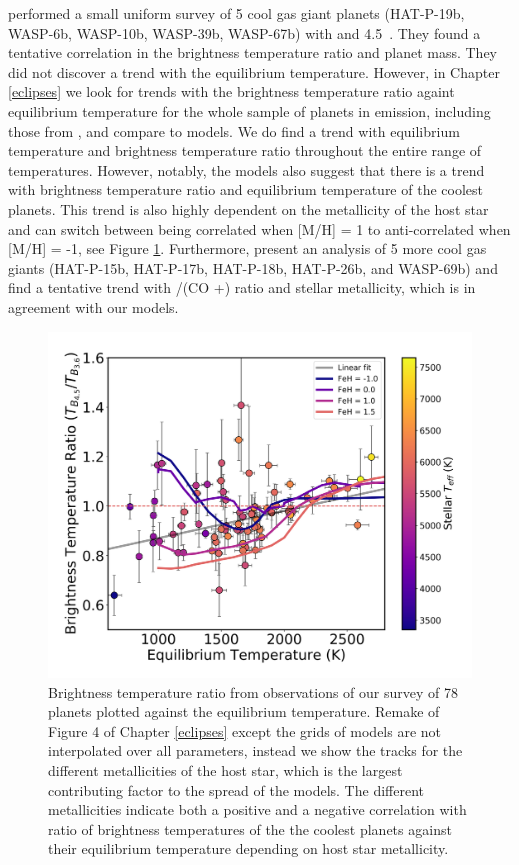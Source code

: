 \citet{Kammer2015} performed a small uniform survey of 5 cool gas giant planets (HAT-P-19b, WASP-6b, WASP-10b, WASP-39b, WASP-67b) with  and 4.5~\um. They found a tentative correlation in the brightness temperature ratio and planet mass. They did not discover a trend with the equilibrium temperature. However, in Chapter \ref{eclipses} we look for trends with the brightness temperature ratio againt equilibrium temperature for the whole sample of planets in emission, including those from \citet{Kammer2015}, and compare to models.
We do find a trend with equilibrium temperature and brightness temperature ratio throughout the entire range of temperatures. However, notably, the models also suggest that there is a trend with brightness temperature ratio and equilibrium temperature of the coolest planets. This trend is also highly dependent on the metallicity of the host star and can switch between being correlated when [M/H] = 1 to anti-correlated when [M/H] = -1, see Figure \ref{int:fig:Tbratio}. Furthermore, \citet{Wallack2019} present an analysis of 5 more cool gas giants (HAT-P-15b, HAT-P-17b, HAT-P-18b, HAT-P-26b, and WASP-69b) and find a tentative trend with /(CO +) ratio and stellar metallicity, which is in agreement with our models.

\begin{figure}
    \centering
    \includegraphics[width = \linewidth]{TbratiovsTeq_PHOENIX_intpl_wlabels.pdf}
    \caption{Brightness temperature ratio from \spitzerIRAC observations of our survey of 78 planets plotted against the equilibrium temperature. Remake of Figure 4 of Chapter \ref{eclipses} except the grids of models are not interpolated over all parameters, instead we show the tracks for the different metallicities of the host star, which is the largest contributing factor to the spread of the models. The different metallicities indicate both a positive and a negative correlation with ratio of brightness temperatures of the the coolest planets against their equilibrium temperature depending on host star metallicity. }
    \label{int:fig:Tbratio}
\end{figure}


